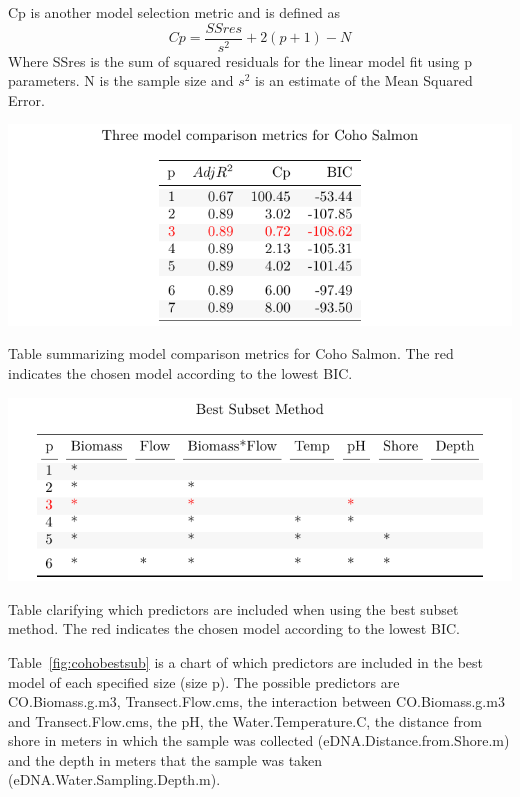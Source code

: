 \vspace{5mm}

Cp is another model selection metric and is defined as $$Cp=\frac{SSres}{s^{2}}+2(p+1)-N$$ Where SSres is the sum of squared residuals for the linear model fit using p parameters. N is the sample size and $s^{2}$ is an estimate of the Mean Squared Error.

\vspace{5mm}

 \begin{singlespace*}
\fontsize{11pt}{12pt}\selectfont

\end{singlespace*}


\begin{table}[H]
\includegraphics{Chapter5Images/subsets_kable.pdf}
\caption{ Table summarizing model comparison metrics for Coho Salmon. The red indicates the chosen model according to the lowest BIC.}
\label{fig:cohocompare}
\end{table}

\begin{table}[H]
\includegraphics{Chapter5Images/best_subredo.pdf}
\caption{  Table clarifying which predictors are included when using the best subset method. The red indicates the chosen model according to the lowest BIC.}
\label{fig:cohobestsub}
\end{table}

Table~\ref{fig:cohobestsub} is a chart of which predictors are included in the best model of each specified size (size p). The possible predictors are CO.Biomass.g.m3, Transect.Flow.cms, the interaction between CO.Biomass.g.m3 and Transect.Flow.cms, the pH, the Water.Temperature.C, the distance from shore in meters in which the sample was collected (eDNA.Distance.from.Shore.m) and the depth in meters that the sample was taken (eDNA.Water.Sampling.Depth.m).

